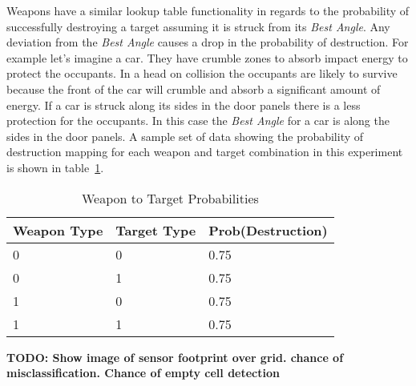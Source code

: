 
Weapons have a similar lookup table functionality in regards to the probability of successfully destroying a target assuming it is struck from its \textit{Best Angle}.  Any deviation from the \textit{Best Angle} causes a drop in the probability of destruction.  For example let's imagine a car.  They have crumble zones to absorb impact energy to protect the occupants.  In a head on collision the occupants are likely to survive because the front of the car will crumble and absorb a significant amount of energy.  If a car is struck along its sides in the door panels there is a less protection for the occupants.  In this case the \textit{Best Angle} for a car is along the sides in the door panels. A sample set of data showing the probability of destruction mapping for each weapon and target combination in this experiment is shown in table~\ref{tab:wpnTgtProb}.

\begin{table}[H]
	\caption{Weapon to Target Probabilities}
	\centering
	\label{tab:wpnTgtProb}
	\begin{tabular}{|p{1.5cm}|p{1.5cm}|p{3cm}|}
		\hline
		Weapon Type & Target Type & Prob(Destruction)\\ \hline
		0 & 0 & 0.75 \\
		0 & 1 & 0.75 \\
		1 & 0 & 0.75 \\
		1 & 1 & 0.75 \\
		\hline
	\end{tabular}
\end{table}
\textbf{TODO: Show image of sensor footprint over grid. chance of misclassification. Chance of empty cell detection}


